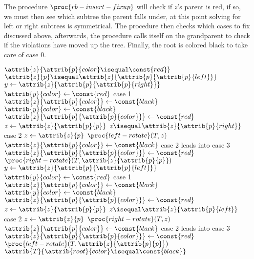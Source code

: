 \documentclass{article}
\begin{document}
The procedure $\proc{rb-insert-fixup}$ will check if $z$'s parent is red, if so, we must then see which subtree the parent falls under, at this point solving for left or right subtrees is symmetrical. The procedure then checks which cases to fix discussed above, afterwards, the procedure calls itself on the grandparent to check if the violations have moved up the tree. Finally, the root is colored black to take care of case 0.

\newpage

\begin{codebox}
\li \While $\attrib{z}{\attrib{p}{color} \isequal \const{red}}$
    \Do
\li     \If $\attrib{z}{p} \isequal \attrib{z}{\attrib{p}{\attrib{p}{left}}}$
\li     \Then
            $y \gets{\attrib{z}{\attrib{p}{\attrib{p}{right}}}}$
\li         \If $\attrib{y}{color} \gets{\const{red}}$ \Comment case 1
\li         \Then
                $\attrib{z}{\attrib{p}{color}} \gets{\const{black}}$
\li             $\attrib{y}{color} \gets{\const{black}}$
\li             $\attrib{z}{\attrib{p}{\attrib{p}{color}}} \gets{\const{red}}$
\li             $z \gets{\attrib{z}{\attrib{p}{p}}}$
\li         \Else
\li             \If $z \isequal \attrib{z}{\attrib{p}{right}}$ \Comment case 2
\li             \Then
                    $z \gets{\attrib{z}{p}}$
\li                 $\proc{left-rotate}(T, z)$
                \End
\li             $\attrib{z}{\attrib{p}{color}}
\gets{\const{black}}$ \Comment case 2 leads into case 3
\li             $\attrib{z}{\attrib{p}{\attrib{p}{color}}} \gets{\const{red}}$
\li             $\proc{right-rotate}(T, \attrib{z}{\attrib{p}{p}})$
            \End
\li     \Else
\li         $y \gets{\attrib{z}{\attrib{p}{\attrib{p}{left}}}}$
\li         \If $\attrib{y}{color} \gets{\const{red}}$ \Comment case 1
\li         \Then
                $\attrib{z}{\attrib{p}{color}} \gets{\const{black}}$
\li             $\attrib{y}{color} \gets{\const{black}}$
\li             $\attrib{z}{\attrib{p}{\attrib{p}{color}}} \gets{\const{red}}$
\li             $z \gets{\attrib{z}{\attrib{p}{p}}}$
\li         \Else
\li             \If $z \isequal \attrib{z}{\attrib{p}{left}}$ \Comment case 2
\li             \Then
                    $z \gets{\attrib{z}{p}}$
\li                 $\proc{right-rotate}(T, z)$
                \End
\li             $\attrib{z}{\attrib{p}{color}} \gets{\const{black}}$ \Comment case 2 leads into case 3
\li             $\attrib{z}{\attrib{p}{\attrib{p}{color}}} \gets{\const{red}}$
\li             $\proc{left-rotate}(T, \attrib{z}{\attrib{p}{p}})$
            \End
        \End
    \End
\li $\attrib{T}{\attrib{root}{color} \isequal \const{black}}$
\end{codebox}
\end{document}
